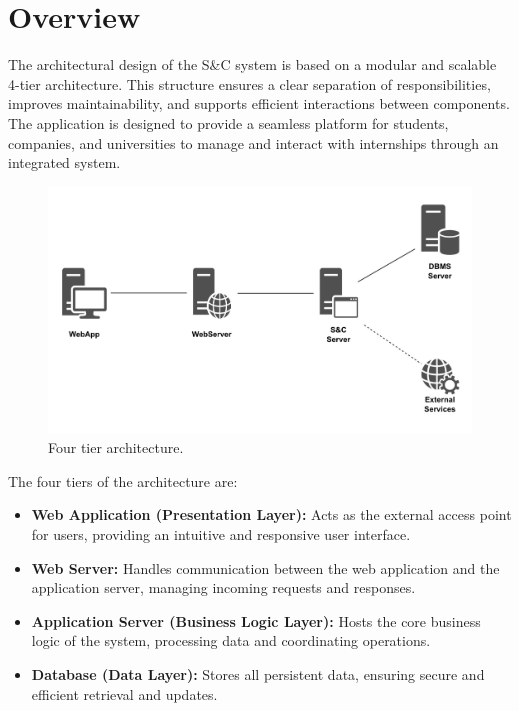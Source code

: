 \section{Overview}
\label{sec:overview}%

The architectural design of the S\&C system is based on a modular and scalable 4-tier architecture. This structure ensures a clear separation of responsibilities, improves maintainability, and supports efficient interactions between components. The application is designed to provide a seamless platform for students, companies, and universities to manage and interact with internships through an integrated system.

\begin{figure}[H]
    \centering
    \includegraphics[width=\linewidth]{DD/Images/overview.jpg}
    \caption{Four tier architecture.}
    \label{fig:overview}
\end{figure}

\newpage

The four tiers of the architecture are:

\begin{itemize}
    \item
        \textbf{Web Application (Presentation Layer):} Acts as the external access point for users, providing an intuitive and responsive user interface.
    \item 
        \textbf{Web Server:} Handles communication between the web application and the application server, managing incoming requests and responses.
    \item 
        \textbf{Application Server (Business Logic Layer):} Hosts the core business logic of the system, processing data and coordinating operations.
    \item 
        \textbf{Database (Data Layer):} Stores all persistent data, ensuring secure and efficient retrieval and updates.
\end{itemize}


